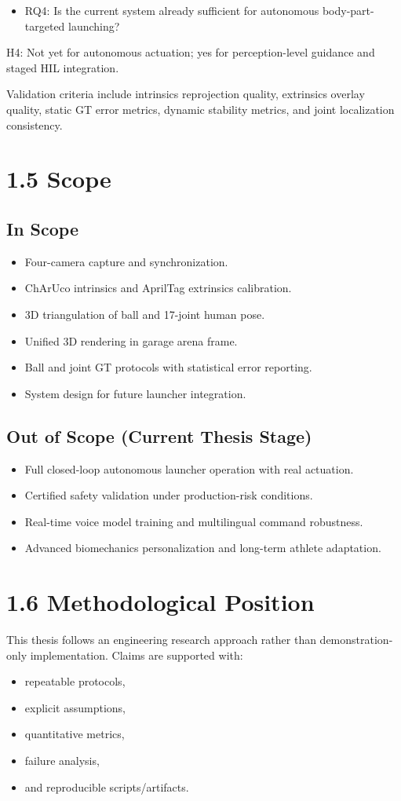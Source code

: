 \begin{itemize}
  \item RQ4: Is the current system already sufficient for autonomous body-part-targeted launching?
\end{itemize}
  H4: Not yet for autonomous actuation; yes for perception-level guidance and staged HIL integration.

Validation criteria include intrinsics reprojection quality, extrinsics overlay quality, static GT error metrics, dynamic stability metrics, and joint localization consistency.

\section{1.5 Scope}
\subsection{In Scope}
\begin{itemize}
  \item Four-camera capture and synchronization.
  \item ChArUco intrinsics and AprilTag extrinsics calibration.
  \item 3D triangulation of ball and 17-joint human pose.
  \item Unified 3D rendering in garage arena frame.
  \item Ball and joint GT protocols with statistical error reporting.
  \item System design for future launcher integration.
\end{itemize}

\subsection{Out of Scope (Current Thesis Stage)}
\begin{itemize}
  \item Full closed-loop autonomous launcher operation with real actuation.
  \item Certified safety validation under production-risk conditions.
  \item Real-time voice model training and multilingual command robustness.
  \item Advanced biomechanics personalization and long-term athlete adaptation.
\end{itemize}

\section{1.6 Methodological Position}
This thesis follows an engineering research approach rather than demonstration-only implementation. Claims are supported with:
\begin{itemize}
  \item repeatable protocols,
  \item explicit assumptions,
  \item quantitative metrics,
  \item failure analysis,
  \item and reproducible scripts/artifacts.
\end{itemize}

